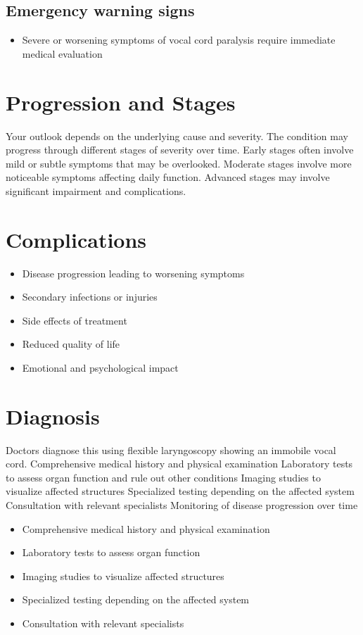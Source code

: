 \subsection{Emergency warning signs}
\begin{itemize}[noitemsep]
  \item Severe or worsening symptoms of vocal cord paralysis require immediate medical evaluation
\end{itemize}
\section{Progression and Stages}
Your outlook depends on the underlying cause and severity. The condition may progress through different stages of severity over time. Early stages often involve mild or subtle symptoms that may be overlooked. Moderate stages involve more noticeable symptoms affecting daily function. Advanced stages may involve significant impairment and complications.
\section{Complications}
\begin{itemize}[noitemsep]
  \item Disease progression leading to worsening symptoms
  \item Secondary infections or injuries
  \item Side effects of treatment
  \item Reduced quality of life
  \item Emotional and psychological impact
\end{itemize}
\section{Diagnosis}
Doctors diagnose this using flexible laryngoscopy showing an immobile vocal cord. Comprehensive medical history and physical examination Laboratory tests to assess organ function and rule out other conditions Imaging studies to visualize affected structures Specialized testing depending on the affected system Consultation with relevant specialists Monitoring of disease progression over time

\begin{itemize}[noitemsep]
  \item Comprehensive medical history and physical examination
  \item Laboratory tests to assess organ function
  \item Imaging studies to visualize affected structures
  \item Specialized testing depending on the affected system
  \item Consultation with relevant specialists
\end{itemize}
